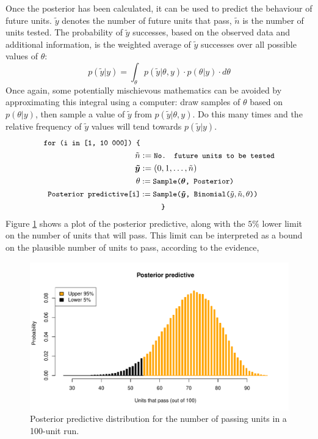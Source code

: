 \documentclass[11pt,a4paper,article]{memoir} %
\begin{document}
Once the posterior has been calculated, it can be used to predict the behaviour of future units. $\tilde{y}$ denotes the number of future units that pass, $\tilde{n}$ is the number of units tested. The probability of $\tilde{y}$ successes, based on the observed data and additional information, is the weighted average of $\tilde{y}$ successes over all possible values of $\theta$:
\begin{equation}
	p(\tilde{y}|y) = \int_{\theta}p(\tilde{y}|\theta, y)\cdot p(\theta|y) \cdot d\theta
\end{equation}
Once again, some potentially mischievous mathematics can be avoided by approximating this integral using a computer: draw samples of $\theta$ based on $p(\theta|y)$, then sample a value of $\tilde{y}$ from $p(\tilde{y}|\theta, y)$. Do this many times and the relative frequency of $\tilde{y}$ values will tend towards $p(\tilde{y}|y)$.
\begin{align*}
\small{\texttt{for (i in [1, 10 000]) \{}} &\\
	\tilde{n} &:= \small{\texttt{No. future units to be tested}} \\
	\boldsymbol{\tilde{y}} &:= (0, 1, \dots, \tilde{n}) \\
	\theta &:= \small{\texttt{Sample(}}\boldsymbol{\theta}\small{\texttt{, Posterior)}} \\
	\small{\texttt{Posterior predictive[i]}} &:= \small{\texttt{Sample(}}\boldsymbol{\tilde{y}}\small{\texttt{, Binomial(}}\tilde{y}, \tilde{n}, \theta\small{\texttt{))}}\\
	&\quad\quad \small{\texttt{ \} }}
\end{align*}
Figure \ref{fig:posterior_predictive} shows a plot of the posterior predictive, along with the $5\%$ lower limit on the number of units that will pass. This limit can be interpreted as a bound on the plausible number of units to pass, according to the evidence,
\begin{figure}
\includegraphics[width=\textwidth]{posterior_predictive.pdf}
\caption{Posterior predictive distribution for the number of passing units in a 100-unit run.}
\label{fig:posterior_predictive}
\end{figure}
\end{document}
